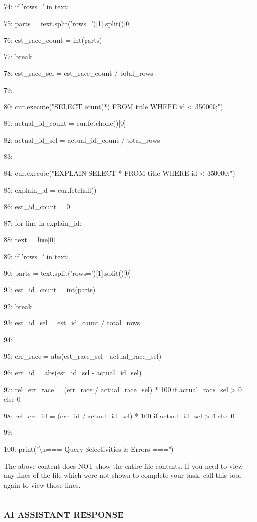 \documentclass[11pt,a4paper]{article}
\begin{document}
74:         if 'rows=' in text:

75:             parts = text.split('rows=')[1].split()[0]

76:             est\_race\_count = int(parts)

77:             break

78:     est\_race\_sel = est\_race\_count / total\_rows

79:

80:     cur.execute("SELECT count(*) FROM title WHERE id < 350000;")

81:     actual\_id\_count = cur.fetchone()[0]

82:     actual\_id\_sel = actual\_id\_count / total\_rows

83:

84:     cur.execute("EXPLAIN SELECT * FROM title WHERE id < 350000;")

85:     explain\_id = cur.fetchall()

86:     est\_id\_count = 0

87:     for line in explain\_id:

88:         text = line[0]

89:         if 'rows=' in text:

90:             parts = text.split('rows=')[1].split()[0]

91:             est\_id\_count = int(parts)

92:             break

93:     est\_id\_sel = est\_id\_count / total\_rows

94:

95:     err\_race = abs(est\_race\_sel - actual\_race\_sel)

96:     err\_id = abs(est\_id\_sel - actual\_id\_sel)

97:     rel\_err\_race = (err\_race / actual\_race\_sel) * 100 if actual\_race\_sel > 0 else 0

98:     rel\_err\_id = (err\_id / actual\_id\_sel) * 100 if actual\_id\_sel > 0 else 0

99:

100:     print("\textbackslash{}n=== Query Selectivities \& Errors ===")

The above content does NOT show the entire file contents. If you need to view any lines of the file which were not shown to complete your task, call this tool again to view those lines.


\hrule

\subsubsection{AI ASSISTANT RESPONSE}
\end{document}
